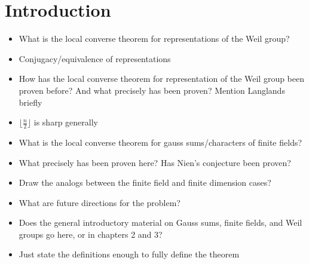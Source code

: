 \chapter{Introduction}	%
\begin{itemize}

\item What is the local converse theorem for representations of the Weil group?
\item Conjugacy/equivalence of representations
\item How has the local converse theorem for representation of the Weil group been proven before? And what precisely has been proven? Mention Langlands briefly
\item $\lfloor \frac{n}{2} \rfloor$ is sharp generally
\item What is the local converse theorem for gauss sums/characters of finite fields?
\item What precisely has been proven here? Has Nien's conjecture been proven?
\item Draw the analogs between the finite field and finite dimension cases?
\item What are future directions for the problem?
\item Does the general introductory material on Gauss sums, finite fields, and Weil groups go here, or in chapters 2 and 3?
\item Just state the definitions enough to fully define the theorem

\end{itemize}
\endinput